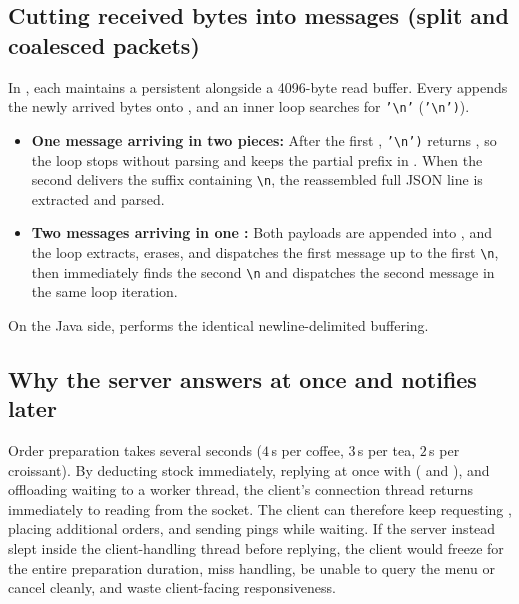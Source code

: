 \documentclass{../latex/utmreport}
\begin{document}
\subsection{Cutting received bytes into messages (split and coalesced packets)}
In , each  maintains a persistent  alongside a 4096-byte  read buffer. Every  appends the newly arrived bytes onto , and an inner  loop searches for \texttt{'\textbackslash n'} (\allowbreak\texttt{'\textbackslash n')}).
\begin{itemize}
  \item \textbf{One message arriving in two pieces:} After the first , \allowbreak\texttt{'\textbackslash n')} returns , so the loop stops without parsing and keeps the partial prefix in . When the second  delivers the suffix containing \texttt{\textbackslash n}, the reassembled full JSON line is extracted and parsed.
  \item \textbf{Two messages arriving in one :} Both payloads are appended into , and the  loop extracts, erases, and dispatches the first message up to the first \texttt{\textbackslash n}, then immediately finds the second \texttt{\textbackslash n} and dispatches the second message in the same loop iteration.
\end{itemize}
On the Java side,  performs the identical newline-delimited buffering.

\subsection{Why the server answers at once and notifies later}
Order preparation takes several seconds ($4$\,s per coffee, $3$\,s per tea, $2$\,s per croissant). By deducting stock immediately, replying at once with  ( and ), and offloading waiting to a worker thread, the client's connection thread returns immediately to reading from the socket. The client can therefore keep requesting , placing additional orders, and sending  pings while waiting. If the server instead slept inside the client-handling thread before replying, the client would freeze for the entire preparation duration, miss  handling, be unable to query the menu or cancel cleanly, and waste client-facing responsiveness.
\end{document}
